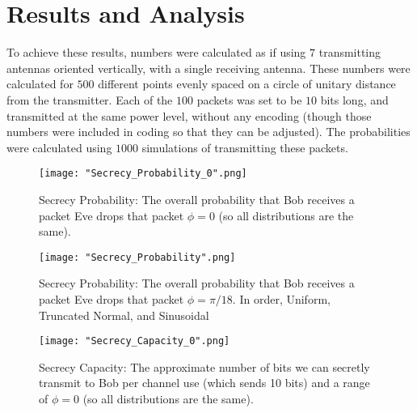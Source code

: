 \documentclass[letterpaper, 10 pt, conference]{ieeetran}  %
\theoremstyle{definition}
\theoremstyle{theorem}
\begin{document}

\section{Results and Analysis}
To achieve these results, numbers were calculated as if using $7$ transmitting antennas oriented vertically, with a single receiving antenna.  
These numbers were calculated for $500$ different points evenly spaced on a circle of unitary distance from the transmitter.  
Each of the $100$ packets was set to be $10$ bits long, and transmitted at the same power level, without any encoding (though those numbers were included in coding so that they can be adjusted).  
The probabilities were calculated using $1000$ simulations of transmitting these packets.  
\begin{figure}
\centering
\texttt{[image: "Secrecy\_Probability\_0".png]}
\caption{Secrecy Probability: The overall probability that Bob receives a packet Eve drops that packet $\phi=0$ (so all distributions are the same).}
\label{fig:secprob0}
\end{figure}

\begin{figure}
\centering
\texttt{[image: "Secrecy\_Probability".png]}
\caption{Secrecy Probability: The overall probability that Bob receives a packet Eve drops that packet $\phi=\pi/18$.  In order, Uniform, Truncated Normal, and Sinusoidal}
\label{fig:secprobpi18}
\end{figure}

\begin{figure}
\centering
\texttt{[image: "Secrecy\_Capacity\_0".png]}
\caption{Secrecy Capacity: The approximate number of bits we can secretly transmit to Bob per channel use (which sends 10 bits) and a range of $\phi=0$ (so all distributions are the same).}
\label{fig:seccap0}
\end{figure}
\end{document}
